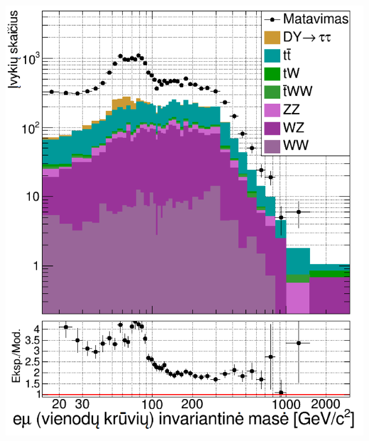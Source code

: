 \documentclass[xcolor=dvipsnames]{beamer}
\begin{document}
\begin{frame}
\begin{minipage}{0.44\textwidth}
		\includegraphics[width=\linewidth]{emuMassSS_SMALL.png}
	\end{minipage}
\end{frame}
\end{document}
